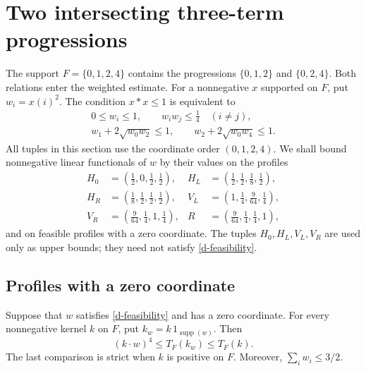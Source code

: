 \section{Two intersecting three-term progressions}\label{sec:double}

The support $F=\{0,1,2,4\}$ contains the progressions $\{0,1,2\}$ and
$\{0,2,4\}$. Both relations enter the weighted estimate. For a nonnegative
$x$ supported on $F$, put $w_i=x(i)^2$. The condition $x*x\leq 1$ is
equivalent to
\begin{equation}\label{d-feasibility}
\begin{gathered}
0\leq w_i\leq1,\qquad w_iw_j\leq\tfrac14\quad(i\ne j),\\
w_1+2\sqrt{w_0w_2}\leq1,\qquad
w_2+2\sqrt{w_0w_4}\leq1.
\end{gathered}
\end{equation}
All tuples in this section use the coordinate order $(0,1,2,4)$. We shall
bound nonnegative linear functionals of $w$ by their values on the profiles
\begin{equation}\label{d-profiles}
\begin{aligned}
H_0&=(\tfrac12,0,\tfrac12,\tfrac12),&
H_L&=(\tfrac12,\tfrac12,\tfrac18,\tfrac12),\\
H_R&=(\tfrac18,\tfrac12,\tfrac12,\tfrac12),&
V_L&=(1,\tfrac14,\tfrac9{64},\tfrac14),\\
V_R&=(\tfrac9{64},\tfrac14,1,\tfrac14),&
R&=(\tfrac9{64},\tfrac14,\tfrac14,1),
\end{aligned}
\end{equation}
and on feasible profiles with a zero coordinate. The tuples
$H_0,H_L,V_L,V_R$ are used only as upper bounds; they need not satisfy
\eqref{d-feasibility}.

\subsection{Profiles with a zero coordinate}

\begin{lemma}\label{d-boundary}
Suppose that $w$ satisfies \eqref{d-feasibility} and has a zero coordinate.
For every nonnegative kernel $k$ on $F$, put
$k_w=k\,1_{\operatorname{supp}(w)}$. Then
\begin{equation}\label{d-boundary-comparison}
(k\cdot w)^4\leq T_F(k_w)\leq T_F(k).
\end{equation}
The last comparison is strict when $k$ is positive on $F$. Moreover,
$\sum_iw_i\leq3/2$.
\end{lemma}

